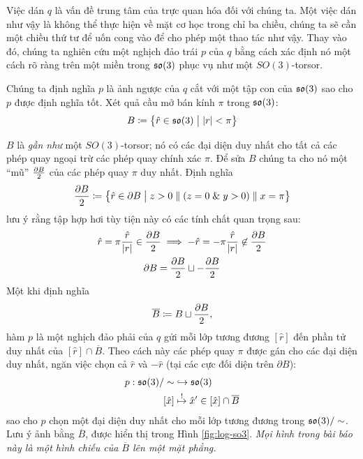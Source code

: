 \documentclass{article}
\theoremstyle{plain}
\theoremstyle{definition}
\begin{document}
    Việc dán $q$ là vấn đề trung tâm của trực quan hóa đối với chúng ta. Một việc dán như vậy là không thể thực hiện về mặt cơ học trong chỉ ba chiều, chúng ta sẽ cần một chiều thứ tư để uốn cong vào để cho phép một thao tác như vậy. Thay vào đó, chúng ta nghiên cứu một nghịch đảo trái $p$ của $q$ bằng cách xác định nó một cách rõ ràng trên một miền trong $\mathfrak{so}(3)$ phục vụ như một $SO(3)$-torsor.
    
    Chúng ta định nghĩa $p$ là ảnh ngược của $q$ cắt với một tập con của $\mathfrak{so}(3)$ sao cho $p$ được định nghĩa tốt. Xét quả cầu mở bán kính $\pi$ trong $\mathfrak{so}(3)$:
    \begin{equation}
        B\coloneqq\left\{\hat{r}\in\mathfrak{so}(3)\hspace{1mm}\big|\hspace{1mm} |r|<\pi\right\}
    \end{equation}
    
    $B$ là \emph{gần như} một $SO(3)$-torsor; nó có các đại diện duy nhất cho tất cả các phép quay ngoại trừ các phép quay chính xác $\pi$. Để sửa $B$ chúng ta cho nó một ``mũ'' $\frac{\partial B}{2}$ của các phép quay $\pi$ duy nhất.  Định nghĩa
    \begin{equation}
        \frac{\partial B}{2}\coloneqq\left\{\hat{r}\in\partial B\hspace{1mm}\big|\hspace{1mm} z>0\parallel (z=0\hspace{1mm}\mathrm{\&}\hspace{1mm} y>0)\parallel x=\pi\right\}
    \end{equation}
    lưu ý rằng tập hợp hơi tùy tiện này có các tính chất quan trọng sau:
    \begin{gather}
        \hat{r}=\pi\frac{\hat{r}}{|r|}\in \hem\implies -\hat{r}=-\pi\frac{\hat{r}}{|r|}\not\in \hem\label{pnp}\\
        \partial B=\hem\sqcup -\hem\label{djb}
    \end{gather}
    Một khi định nghĩa
    \begin{equation}
        \overline{B}\coloneqq B\sqcup \frac{\partial B}{2},
    \end{equation}
    hàm $p$ là một nghịch đảo phải của $q$ gửi mỗi lớp tương đương $[\hat{r}]$ đến phần tử duy nhất của $[\hat{r}]\cap\overline{B}$. Theo cách này các phép quay $\pi$ được gán cho các đại diện duy nhất, ngăn việc chọn cả $\hat{r}$ và $-\hat{r}$ (tại các cực đối diện trên $\partial B$):
    \begin{align}
        p:\mathfrak{so}(3)/\sim &\hookrightarrow \mathfrak{so}(3) \\
        [\hat{x}]&\overset{! }{\mapsto} \hat{x}'\in [\hat{x}]\cap\overline{B}
    \end{align}
    sao cho $p$ chọn một đại diện duy nhất cho mỗi lớp tương đương trong $\mathfrak{so}(3)/\sim$. Lưu ý ảnh bằng $\overline{B}$, được hiển thị trong Hình \ref{fig:log-so3}.  \emph{Mọi hình trong bài báo này là một hình chiếu của $\overline{B}$ lên một mặt phẳng. }
\end{document}
